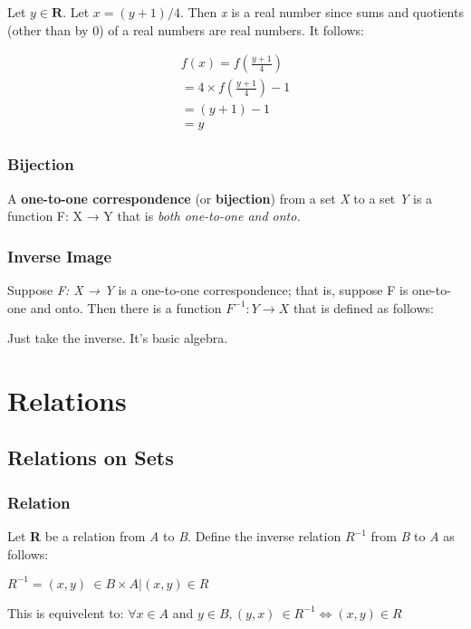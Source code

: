 \documentclass[12pt]{article}
\begin{document}
Let $y \in \mathbf{R}$. Let $x = (y + 1)/4$. Then \textit{x} is a real number since sums and quotients (other than by 0) of a real numbers are real numbers. It follows:

\begin{align*}
f( x ) = f(\frac{y+1}{4}) \\
 =  4 \times f(\frac{y+1}{4}) - 1 \\
 =  (y + 1) - 1 \\
 =   y
\end{align*}

\subsubsection*{Bijection}
A \textbf{one-to-one correspondence} (or \textbf{bijection}) from a set \textit{X} to a set \textit{Y} is a function F: X → Y that is \textit{both one-to-one and onto.}

\subsubsection*{Inverse Image}
Suppose \textit{F: X → Y} is a one-to-one correspondence; that is, suppose F is one-to-one and onto. Then there is a function $F^{-1}: Y \rightarrow X$ that is defined as follows:

Just take the inverse. It's basic algebra.

\section{Relations}
\subsection{Relations on Sets}

\subsubsection*{Relation}
Let \textbf{R} be a relation from \textit{A} to \textit{B}. Define the inverse relation $R^{-1}$ from \textit{B} to \textit{A} as follows:

\begin{center} $R^{-1} = {(x,y)\ \in \textit{B} \times \textit{A} | { (x,y) \in \textit{R} }}$ \end{center}

This is equivelent to: $\forall x \in \textit{A}$ and $y \in \textit{B},  (y,x)\ \in R^{-1} \Leftrightarrow (x,y) \in R$
\end{document}
